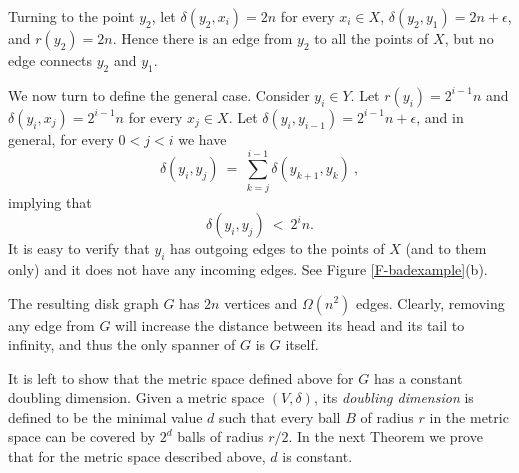 \documentclass[proceedings]{stacs}
\theoremstyle{plain}\newtheorem{satz}[thm]{Satz}
\theoremstyle{definition}\newtheorem{crucial}[thm]{Crucial Definition}
\newcommand{\eps}{\epsilon}
\begin{document}
Turning to the point $y_2$, let $\delta(y_2,x_i)=2n$ for every
$x_i \in X$, $\delta(y_2,y_1)=2n+\eps$, and $r(y_2) = 2n$. Hence
there is an edge from $y_2$ to all the points of $X$, but no edge
connects $y_2$ and $y_1$.

We now turn to define the general case. Consider $y_i \in Y$. Let
$r(y_i)=2^{i-1}n$ and $\delta(y_i,x_j)=2^{i-1}n$ for every $x_j\in
X$. Let $\delta(y_i,y_{i-1})=2^{i-1}n+\eps$, and in general, for
every $0<j<i$ we have
\begin{equation}
\label{eq:dist} \delta(y_i,y_j) ~=~
\sum_{k=j}^{i-1}\delta(y_{k+1},y_k)~,
\end{equation}
implying that
\begin{equation}
\label{eq:dist2} \delta(y_i,y_j) ~<~ 2^in.
\end{equation}
It is easy to verify that $y_i$ has outgoing edges to the points
of $X$ (and to them only) and it does not have any incoming edges.
See Figure \ref{F-badexample}(b).

The resulting disk graph $G$ has $2n$ vertices and $\Omega(n^2)$
edges. Clearly, removing any edge from $G$ will increase the
distance between its head and its tail to infinity, and thus the
only spanner of $G$ is $G$ itself.

It is left to show that the metric space defined above for $G$ has
a constant doubling dimension. Given a metric space $(V,\delta)$,
its {\em doubling dimension} is defined to be the minimal value
$d$ such that every ball $B$ of radius $r$ in the metric space can
be covered by $2^{d}$ balls of radius $r/2$. In the next Theorem
we prove that for the metric space described above, $d$ is
constant.
\end{document}
